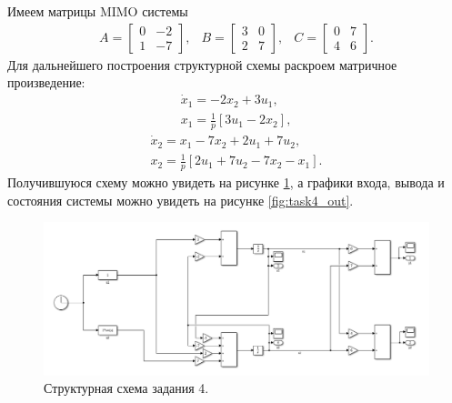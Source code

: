Имеем матрицы MIMO системы
\begin{equation*}
    \begin{array}{ccc}
        A=\begin{bmatrix}
            0&-2\\1&-7
        \end{bmatrix},&
        B=\begin{bmatrix}
            3&0\\2&7
        \end{bmatrix},&
        C=\begin{bmatrix}
            0&7\\4&6
        \end{bmatrix}.
    \end{array}
\end{equation*}
Для дальнейшего построения структурной схемы раскроем матричное произведение:
\begin{equation*}
    \begin{array}{c}
        \dot x_1=-2x_2+3u_1,\\[2mm]
        x_1=\frac{1}{p}[3u_1-2x_2],
    \end{array}
\end{equation*}
\begin{equation*}
    \begin{array}{c}
        \dot x_2=x_1-7x_2+2u_1+7u_2,\\[2mm]
        x_2=\frac{1}{p}[2u_1+7u_2-7x_2-x_1].
    \end{array}
\end{equation*}
Получившуюся схему можно увидеть на рисунке \ref{fig:task4_slx}, а графики входа,
вывода и состояния системы можно увидеть на рисунке \ref{fig:task4_out}.
\begin{figure}[htbp]
    \centering
    \includegraphics[width=1\linewidth]{figs/task_4_slx.png}
    \caption{Структурная схема задания 4.}
    \label{fig:task4_slx}
\end{figure}

